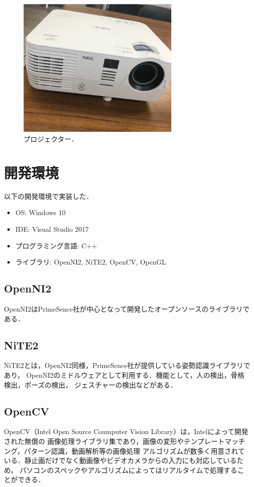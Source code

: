 \vspace{1cm}
\begin{figure}[h]
    \centering
    \includegraphics[width=8cm]{image/projector.png}
    \caption[プロジェクター]{プロジェクター．}
  \label{projector}
\end{figure}
\vspace{1cm}


\section{開発環境}
以下の開発環境で実装した．

\begin{itemize}
    \item OS: Windows 10
    \item IDE: Visual Studio 2017
    \item プログラミング言語: C++
    \item ライブラリ: OpenNI2, NiTE2, OpenCV, OpenGL
\end{itemize}

\subsection{OpenNI2}
OpenNI2はPrimeSence社が中心となって開発したオープンソースのライブラリである\cite{motion}．

\subsection{NiTE2}
NiTE2とは，OpenNI2同様，PrimeSence社が提供している姿勢認識ライブラリであり，
OpenNI2のミドルウェアとして利用する．機能として，人の検出，骨格検出，ポーズの検出，
ジェスチャーの検出などがある\cite{motion}．

\subsection{OpenCV}
OpenCV（Intel Open Source Coumputer Vision Library）は，Intelによって開発された無償の
画像処理ライブラリ集であり，画像の変形やテンプレートマッチング，パターン認識，動画解析等の画像処理
アルゴリズムが数多く用意されている．静止画だけでなく動画像やビデオカメラからの入力にも対応しているため，
パソコンのスペックやアルゴリズムによってはリアルタイムで処理することができる\cite{opencv}．

